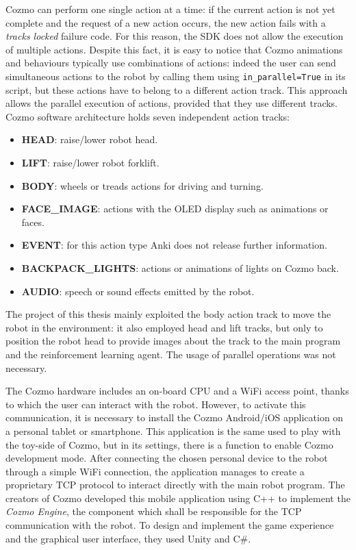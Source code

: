 Cozmo can perform one single action at a time: if the current action is not yet complete and the request of a new action occurs, the new action fails with a \textit{tracks locked} failure code.
For this reason, the SDK does not allow the execution of multiple actions.
Despite this fact, it is easy to notice that Cozmo animations and behaviours typically use combinations of actions: indeed the user can send simultaneous actions to the robot by calling them using \texttt{in\_parallel=True} in its script, but these actions have to belong to a different action track.
This approach allows the parallel execution of actions, provided that they use different tracks.
Cozmo software architecture holds seven independent action tracks:

\begin{itemize}
	\item \textbf{HEAD}: raise/lower robot head.
	\item \textbf{LIFT}: raise/lower robot forklift.
	\item \textbf{BODY}: wheels or treads actions for driving and turning.
	\item \textbf{FACE\_IMAGE}: actions with the OLED display such as animations or faces.
	\item \textbf{EVENT}: for this action type Anki does not release further information.
	\item \textbf{BACKPACK\_LIGHTS}: actions or animations of lights on Cozmo back.
	\item \textbf{AUDIO}: speech or sound effects emitted by the robot.
\end{itemize}

The project of this thesis mainly exploited the body action track to move the robot in the environment: it also employed head and lift tracks, but only to position the robot head to provide images about the track to the main program and the reinforcement learning agent.
The usage of parallel operations was not necessary.

The Cozmo hardware includes an on-board CPU and a WiFi access point, thanks to which the user can interact with the robot.
However, to activate this communication, it is necessary to install the Cozmo Android/iOS application on a personal tablet or smartphone.
This application is the same used to play with the toy-side of Cozmo, but in its settings, there is a function to enable Cozmo development mode.
After connecting the chosen personal device to the robot through a simple WiFi connection, the application manages to create a proprietary TCP protocol to interact directly with the main robot program.
The creators of Cozmo developed this mobile application using C++ to implement the \textit{Cozmo Engine}, the component which shall be responsible for the TCP communication with the robot.
To design and implement the game experience and the graphical user interface, they used Unity and C\#.

